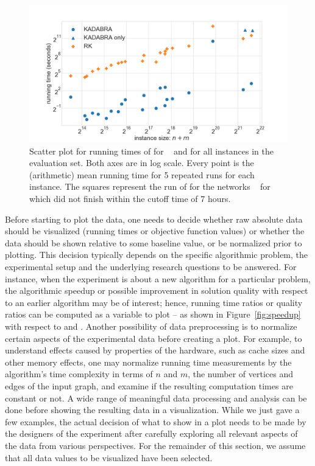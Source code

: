 \documentclass[algorithms,article,submit,moreauthors,pdftex]{Definitions/mdpi}
\newcommand{\changed}[1]{#1}
\newcommand{\changeComment}[1]{}
\begin{document}
\begin{figure}
\centering
\includegraphics[width=\textwidth]{scatterPlot.png}

\caption{ Scatter plot for running times of \kad for \tunParamValue~ and \rk for all instances in the
evaluation set. Both axes are in log scale.
Every point is the (arithmetic) mean running time for 5 repeated runs for each instance.
The squares represent the run of \kad for the networks \changed{\onlyKadInstances~} for which \rk
did not finish within the cutoff time of 7 hours.
\\
\changeComment{Swapped Figures \ref{fig:scatter} and \ref{fig:speedup} to match order in the text.} 
}
\label{fig:scatter}
\end{figure}

Before starting to plot the data, one needs to decide whether raw absolute data should be visualized (\eg running times or objective function values) or whether the data should be shown relative to some baseline value, or be normalized prior to plotting.
This decision typically depends on the specific algorithmic problem, the  experimental setup and the underlying research questions to be answered.
For instance, when the experiment is about a new algorithm for a particular problem, the algorithmic speedup or possible improvement in solution quality with respect to an earlier algorithm may be of interest;
hence, running time ratios or quality ratios can be computed as a variable to plot -- as shown in Figure~\ref{fig:speedup} with respect to \kad and \rk.
Another possibility of data preprocessing is to normalize certain aspects of the experimental data before creating a plot.
For example, to understand effects caused by properties of the hardware, such as cache sizes and other memory effects, one may normalize running time measurements by the algorithm's time complexity in terms of $n$ and $m$, the number of vertices and edges of the input graph, and examine if the resulting computation times are constant or not.
A wide range of meaningful data processing and analysis can be done before showing the resulting data in a visualization.
While we just gave a few examples, the actual decision of what to show in a plot needs to be made by the designers of the experiment after carefully exploring all relevant aspects of the data from various perspectives.
For the remainder of this section, we assume that all data values to be visualized have been selected.
\end{document}

